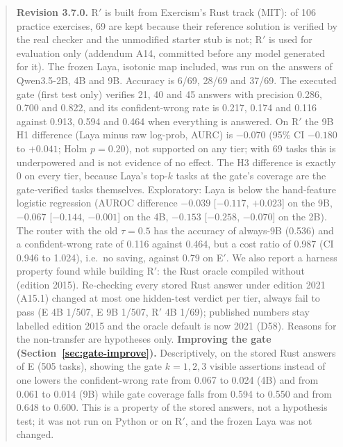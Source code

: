 \documentclass[11pt,a4paper]{article}
\newcommand{\code}[1]{\texttt{\detokenize{#1}}}
\begin{document}
\begin{abstract}
\textbf{Revision 3.7.0.} R$'$ is built from Exercism's Rust track (MIT): of 106 practice exercises, 69 are kept because their reference solution is verified by the
real checker and the unmodified starter stub is not; R$'$ is used for evaluation only (addendum A14, committed before any model generated for it). The frozen Laya, isotonic map
included, was run on the answers of Qwen3.5-2B, 4B and 9B. Accuracy is 6/69, 28/69 and 37/69. The executed gate (first test only) verifies 21, 40 and 45 answers with precision
0.286, 0.700 and 0.822, and its confident-wrong rate is 0.217, 0.174 and 0.116 against 0.913, 0.594 and 0.464 when everything is answered. On R$'$ the 9B H1 difference
(Laya minus raw log-prob, AURC) is $-0.070$ (95\% CI $-0.180$ to $+0.041$; Holm $p=0.20$), not supported on any tier; with 69 tasks this is underpowered and is not evidence of no effect.
The H3 difference is exactly $0$ on every tier, because Laya's top-$k$ tasks at the gate's coverage are the gate-verified tasks themselves. Exploratory: Laya is below the hand-feature logistic regression
(AUROC difference $-0.039$ [$-0.117$, $+0.023$] on the 9B, $-0.067$ [$-0.144$, $-0.001$] on the 4B, $-0.153$ [$-0.258$, $-0.070$] on the 2B). The router with the old $\tau=0.5$ has the accuracy of always-9B
(0.536) and a confident-wrong rate of 0.116 against 0.464, but a cost ratio of 0.987 (CI 0.946 to 1.024), i.e.\ no saving, against 0.79 on E$'$. We also report a harness property found while building R$'$: the Rust oracle
compiled without \code{--edition} (edition 2015). Re-checking every stored Rust answer under edition 2021 (A15.1) changed at most one hidden-test verdict per tier, always fail to pass (E 4B 1/507, E 9B 1/507, R$'$ 4B 1/69); published numbers stay labelled edition 2015 and the oracle default is now 2021 (D58). Reasons for the non-transfer are hypotheses only.
\textbf{Improving the gate (Section~\ref{sec:gate-improve}).} Descriptively, on the stored Rust answers of E (505 tasks), showing the gate $k=1,2,3$ visible assertions instead of one lowers the confident-wrong rate from 0.067 to 0.024 (4B) and from 0.061 to 0.014 (9B) while gate coverage falls from 0.594 to 0.550 and from 0.648 to 0.600. This is a property of the stored answers, not a hypothesis test; it was not run on Python or on R$'$, and the frozen Laya was not changed.


\end{abstract}
\end{document}
